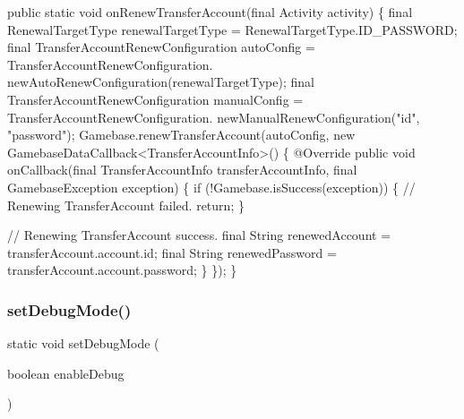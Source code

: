 \begin{DoxyCode}
\textcolor{keyword}{public} \textcolor{keyword}{static} \textcolor{keywordtype}{void} onRenewTransferAccount(\textcolor{keyword}{final} Activity activity) \{
    \textcolor{keyword}{final} RenewalTargetType renewalTargetType = RenewalTargetType.ID\_PASSWORD;
    \textcolor{keyword}{final} TransferAccountRenewConfiguration autoConfig = TransferAccountRenewConfiguration.
      newAutoRenewConfiguration(renewalTargetType);
    \textcolor{keyword}{final} TransferAccountRenewConfiguration manualConfig = TransferAccountRenewConfiguration.
      newManualRenewConfiguration(\textcolor{stringliteral}{"id"}, \textcolor{stringliteral}{"password"});
    Gamebase.renewTransferAccount(autoConfig, \textcolor{keyword}{new} GamebaseDataCallback<TransferAccountInfo>() \{
        @Override
        \textcolor{keyword}{public} \textcolor{keywordtype}{void} onCallback(\textcolor{keyword}{final} TransferAccountInfo transferAccountInfo, \textcolor{keyword}{final} GamebaseException 
      exception) \{
            \textcolor{keywordflow}{if} (!Gamebase.isSuccess(exception)) \{
                \textcolor{comment}{// Renewing TransferAccount failed.}
                \textcolor{keywordflow}{return};
            \}

            \textcolor{comment}{// Renewing TransferAccount success.}
            \textcolor{keyword}{final} String renewedAccount = transferAccount.account.id;
            \textcolor{keyword}{final} String renewedPassword = transferAccount.account.password;
        \}
    \});
\}
\end{DoxyCode}
 \mbox{\label{classcom_1_1toast_1_1android_1_1gamebase_1_1_gamebase_a4370928bb241d35d896feb65e206a7d4}} 
\subsubsection{\texorpdfstring{set\+Debug\+Mode()}{setDebugMode()}}
{\footnotesize\ttfamily static void set\+Debug\+Mode (\begin{DoxyParamCaption}\item[{boolean}]{enable\+Debug }\end{DoxyParamCaption})\hspace{0.3cm}{\ttfamily [static]}}



